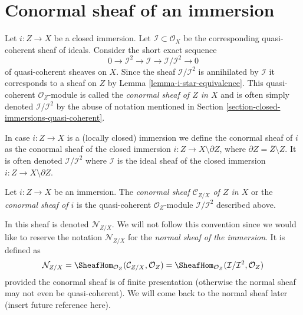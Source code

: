 \section{Conormal sheaf of an immersion}
\label{section-conormal-sheaf}

\noindent
Let $i : Z \to X$ be a closed immersion. Let
$\mathcal{I} \subset \mathcal{O}_X$ be the corresponding quasi-coherent
sheaf of ideals. Consider the short exact sequence
$$
0 \to \mathcal{I}^2 \to \mathcal{I} \to \mathcal{I}/\mathcal{I}^2 \to 0
$$
of quasi-coherent sheaves on $X$. Since the sheaf $\mathcal{I}/\mathcal{I}^2$
is annihilated by $\mathcal{I}$ it corresponds to a sheaf on $Z$ by
Lemma \ref{lemma-i-star-equivalence}. This quasi-coherent
$\mathcal{O}_Z$-module is called the {\it conormal sheaf of $Z$ in $X$}
and is often simply denoted
$\mathcal{I}/\mathcal{I}^2$ by the abuse of notation mentioned in
Section \ref{section-closed-immersions-quasi-coherent}.

\medskip\noindent
In case $i : Z \to X$ is a (locally closed) immersion we define the
conormal sheaf of $i$ as the conormal sheaf of the closed
immersion $i : Z \to X \setminus \partial Z$, where
$\partial Z = \overline{Z} \setminus Z$. It is often denoted
$\mathcal{I}/\mathcal{I}^2$ where $\mathcal{I}$ is the ideal sheaf
of the closed immersion $i : Z \to X \setminus \partial Z$.

\begin{definition}
\label{definition-conormal-sheaf}
Let $i : Z \to X$ be an immersion. The {\it conormal sheaf
$\mathcal{C}_{Z/X}$ of $Z$ in $X$} or the {\it conormal sheaf of $i$}
is the quasi-coherent $\mathcal{O}_Z$-module $\mathcal{I}/\mathcal{I}^2$
described above.
\end{definition}

\noindent
In \cite[IV Definition 16.1.2]{EGA} this sheaf is denoted
$\mathcal{N}_{Z/X}$. We will not follow this convention since we would
like to reserve the notation $\mathcal{N}_{Z/X}$
for the {\it normal sheaf of the immersion}. It is defined as
$$
\mathcal{N}_{Z/X} =
\SheafHom_{\mathcal{O}_Z}(\mathcal{C}_{Z/X}, \mathcal{O}_Z) =
\SheafHom_{\mathcal{O}_Z}(\mathcal{I}/\mathcal{I}^2, \mathcal{O}_Z)
$$
provided the conormal sheaf is of finite presentation (otherwise the
normal sheaf may not even be quasi-coherent). We will come back to the
normal sheaf later (insert future reference here).

